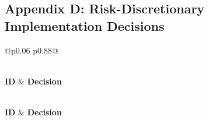 \documentclass[10pt,letterpaper,twocolumn,twoside]{rho-class/rho}
\begin{document}
\subsection*{Appendix D: Risk-Discretionary Implementation Decisions}
\label{app:decisions}

\begin{small}
\setlength{\tabcolsep}{6pt}
\renewcommand{\arraystretch}{1.25}

\begin{longtable}{@{}p{} p{}@{}}
\caption{The risk-discretionary implementation decisions.}
\label{tab:decisions}\\

\hline
\textbf{ID} & \textbf{Decision} \\
\hline
\endfirsthead

\\
\hline
\textbf{ID} & \textbf{Decision} \\
\hline
\endhead

\hline
{}\\
\endfoot

\hline
\endlastfoot


\end{longtable}
\end{small}
\end{document}
